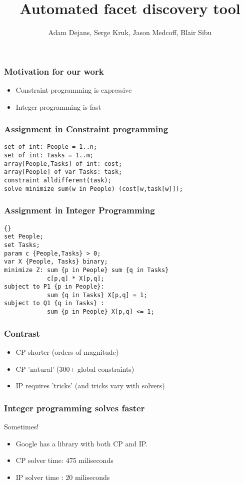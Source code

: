\documentclass{beamer}
\author[Serge Kruk] { Adam Dejans, Serge Kruk, Jason Medcoff, Blair Sibu}
\title{Automated facet discovery tool}
\institute{Oakland University}
\begin{document}
\begin{frame}
  \titlepage
\end{frame}
\lstset{language=Python,label=bin_packing}
\begin{frame}
  \frametitle{Motivation for our work}
  \begin{itemize}
    \item Constraint programming is expressive
    \item Integer programming is fast
  \end{itemize}
\end{frame}

\begin{frame}[fragile]
  \frametitle{Assignment in Constraint programming}
  \begin{lstlisting}
set of int: People = 1..n;
set of int: Tasks = 1..m;
array[People,Tasks] of int: cost;
array[People] of var Tasks: task;
constraint alldifferent(task);
solve minimize sum(w in People) (cost[w,task[w]]);
  \end{lstlisting}
\end{frame}

\begin{frame}[fragile]
  \frametitle{Assignment in Integer Programming}
\begin{lstlisting}{}
set People;
set Tasks;
param c {People,Tasks} > 0;
var X {People, Tasks} binary;
minimize Z: sum {p in People} sum {q in Tasks} 
            c[p,q] * X[p,q];
subject to P1 {p in People}: 
            sum {q in Tasks} X[p,q] = 1;
subject to Q1 {q in Tasks} : 
            sum {p in People} X[p,q] <= 1;
\end{lstlisting}
\end{frame}

\begin{frame}
  \frametitle{Contrast}
  \begin{itemize}
  \item<1-> CP shorter (orders of magnitude)
  \item<2-> CP 'natural' (300+ global constraints)
  \item<3-> IP requires 'tricks' (and tricks vary with solvers)
  \end{itemize}
\end{frame}

\begin{frame}
  \frametitle{Integer programming solves faster}
  \begin{center}
    Sometimes!
  \end{center}
  
  \begin{itemize}
  \item<1-> Google has a library with both CP and IP.
  \item<2-> CP solver time: 475 miliseconds
  \item<3-> IP solver time : 20 miliseconds
  \end{itemize}
\end{frame}
\end{document}
